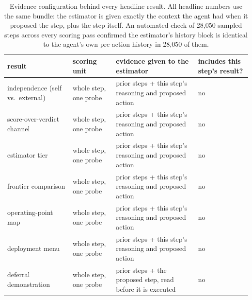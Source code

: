 \begin{table}[t]
\centering
\small
\caption{Evidence configuration behind every headline result. All headline numbers use the same bundle: the estimator is given exactly the context the agent had when it proposed the step, plus the step itself. An automated check of 28,050 sampled steps across every scoring pass confirmed the estimator's history block is identical to the agent's own pre-action history in 28,050 of them.}\label{tab:evconf}
\begin{tabular}{llll}
\toprule
result & scoring unit & evidence given to the estimator & includes this step's result? \\
\midrule
independence (self vs.\ external) & whole step, one probe & prior steps + this step's reasoning and proposed action & no \\
score-over-verdict channel & whole step, one probe & prior steps + this step's reasoning and proposed action & no \\
estimator tier & whole step, one probe & prior steps + this step's reasoning and proposed action & no \\
frontier comparison & whole step, one probe & prior steps + this step's reasoning and proposed action & no \\
operating-point map & whole step, one probe & prior steps + this step's reasoning and proposed action & no \\
deployment menu & whole step, one probe & prior steps + this step's reasoning and proposed action & no \\
deferral demonstration & whole step, one probe & prior steps + the proposed step, read before it is executed & no \\
\bottomrule
\end{tabular}
\end{table}
